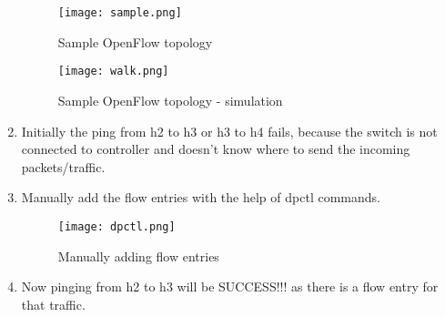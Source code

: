 \documentclass[12pt,a4paper]{article}
\begin{document}
\begin{enumerate}
\begin{figure}[H]
\begin{center}
\texttt{[image: sample.png]}
\end{center}
\caption{Sample OpenFlow topology}
\end{figure}

\begin{figure}[H]
\begin{center}

\texttt{[image: walk.png]}
\end{center}
\caption{Sample OpenFlow topology - simulation}
\end{figure}

\item Initially the ping from h2 to h3 or h3 to h4 fails, because the switch is not connected to controller and  doesn't know where to send the incoming packets/traffic.
\item Manually add the flow entries with the help of dpctl commands.



\begin{figure}[H]
\begin{center}

\texttt{[image: dpctl.png]}
\end{center}
\caption{Manually adding flow entries}
\end{figure}

\item Now pinging from h2 to h3 will be SUCCESS!!! as there is a flow entry for that traffic.

\end{enumerate}
\newpage
\end{document}
